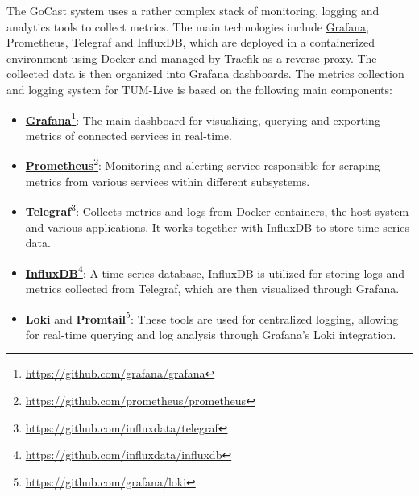 The GoCast system uses a rather complex stack of monitoring, logging and analytics tools to collect metrics. The main technologies include \href{https://github.com/grafana/grafana}{Grafana}, \href{https://github.com/prometheus/prometheus}{Prometheus}, \href{https://github.com/influxdata/telegraf}{Telegraf} and \href{https://github.com/influxdata/influxdb}{InfluxDB}, which are deployed in a containerized environment using Docker and managed by \href{https://github.com/traefik/traefik}{Traefik} as a reverse proxy. The collected data is then organized into Grafana dashboards. The metrics collection and logging system for TUM-Live is based on the following main components:
\begin{itemize}
    \item \textbf{\href{https://github.com/grafana/grafana}{Grafana}}\footnote{\url{https://github.com/grafana/grafana}}: The main dashboard for visualizing, querying and exporting metrics of connected services in real-time.
    \item \textbf{\href{https://github.com/prometheus/prometheus}{Prometheus}}\footnote{\url{https://github.com/prometheus/prometheus}}: Monitoring and alerting service responsible for scraping metrics from various services within different subsystems.
    \item \textbf{\href{https://github.com/influxdata/telegraf}{Telegraf}}\footnote{\url{https://github.com/influxdata/telegraf}}: Collects metrics and logs from Docker containers, the host system and various applications. It works together with InfluxDB to store time-series data.
    \item \textbf{\href{https://github.com/influxdata/influxdb}{InfluxDB}}\footnote{\url{https://github.com/influxdata/influxdb}}: A time-series database, InfluxDB is utilized for storing logs and metrics collected from Telegraf, which are then visualized through Grafana.
    \item \textbf{\href{https://github.com/grafana/loki}{Loki}} and \textbf{\href{https://grafana.com/docs/loki/latest/send-data/promtail/}{Promtail}}\footnote{\url{https://github.com/grafana/loki}}: These tools are used for centralized logging, allowing for real-time querying and log analysis through Grafana's Loki integration.
\end{itemize}

